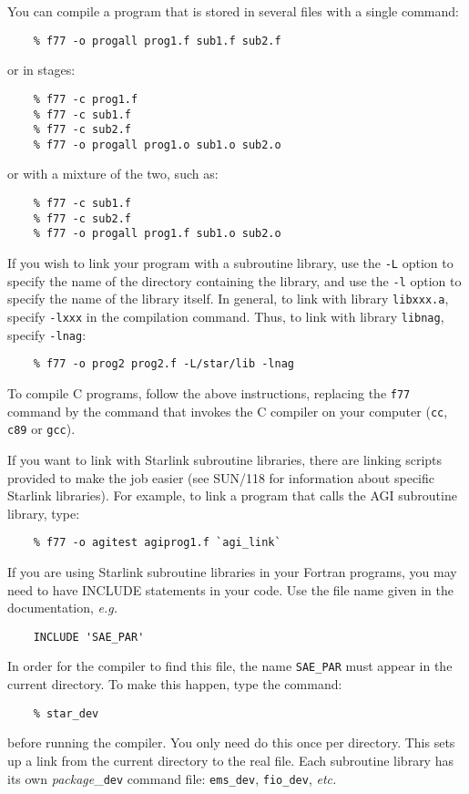 You can compile a program that is stored in several files with a single command:
\begin{verbatim}
    % f77 -o progall prog1.f sub1.f sub2.f
\end{verbatim}
or in stages:
\begin{verbatim}
    % f77 -c prog1.f
    % f77 -c sub1.f
    % f77 -c sub2.f
    % f77 -o progall prog1.o sub1.o sub2.o
\end{verbatim}
or with a mixture of the two, such as:
\begin{verbatim}
    % f77 -c sub1.f
    % f77 -c sub2.f
    % f77 -o progall prog1.f sub1.o sub2.o
\end{verbatim}
If you wish to link your program with a subroutine library, use the {\tt -L}
option to specify the name of the directory containing the library, and use the
{\tt -l} option to specify the name of the library itself.
In general, to link with library {\tt libxxx.a}, specify {\tt -lxxx} in the
compilation command.
Thus, to link with library {\tt libnag}, specify {\tt -lnag}:
\begin{verbatim}
    % f77 -o prog2 prog2.f -L/star/lib -lnag
\end{verbatim}
To compile C programs, follow the above instructions, replacing the {\tt f77}
command by the command that invokes the C compiler on your computer ({\tt cc},
{\tt c89} or {\tt gcc}).

If you want to link with Starlink subroutine libraries, there are linking
scripts provided to make the job easier (see SUN/118 for information about
specific Starlink libraries).
For example, to link a program that calls the AGI subroutine library, type:
\begin{verbatim}
    % f77 -o agitest agiprog1.f `agi_link`
\end{verbatim}
If you are using Starlink subroutine libraries in your Fortran programs, you
may need to have INCLUDE statements in your code.
Use the file name given in the documentation, {\em e.g.}
\begin{verbatim}
    INCLUDE 'SAE_PAR'
\end{verbatim}
In order for the compiler to find this file, the name {\tt SAE\_PAR}
must appear in the current directory.
To make this happen, type the command:
\begin{verbatim}
    % star_dev
\end{verbatim}
before running the compiler.
You only need do this once per directory.
This sets up a link from the current directory to the real file.
Each subroutine library has its own {\em package}\_{\tt dev} command file:
{\tt ems\_dev}, {\tt fio\_dev}, {\em etc.}

